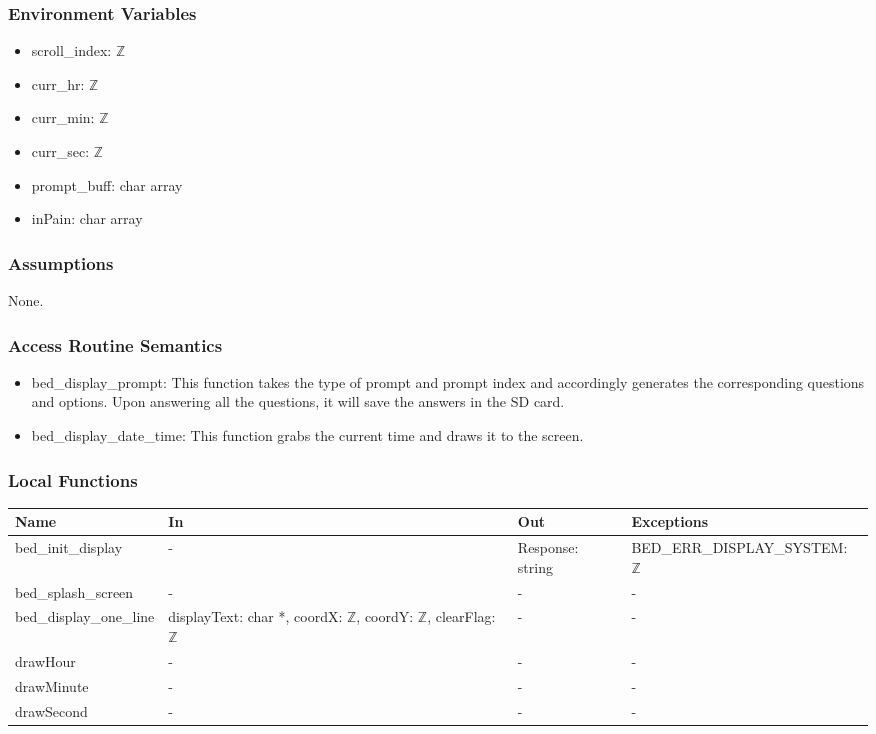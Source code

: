 \documentclass[12pt, titlepage]{article}
\begin{document}
\subsubsection{Environment Variables}

\begin{itemize}
\item scroll\_index: $\mathbb{Z}$
\item curr\_hr: $\mathbb{Z}$
\item curr\_min: $\mathbb{Z}$
\item curr\_sec: $\mathbb{Z}$
\item prompt\_buff: char array
\item inPain: char array
\end{itemize}

\subsubsection{Assumptions}

None.

\subsubsection{Access Routine Semantics}

\begin{itemize}
\item bed\_display\_prompt: This function takes the type of prompt and prompt index and accordingly generates the corresponding questions and options. Upon answering all the questions, it will save the answers in the SD card.
\item bed\_display\_date\_time: This function grabs the current time and draws it to the screen.
\end{itemize}

\subsubsection{Local Functions}

\begin{center}
\begin{tabular}{p{3cm} p{3cm} p{3.5cm} p{4cm}}
\hline
\textbf{Name} & \textbf{In} & \textbf{Out} & \textbf{Exceptions} \\
\hline
bed\_init\_display & - & Response: string & BED\_ERR\_DISPLAY\_SYSTEM: $\mathbb{Z}$  \\
bed\_splash\_screen & - & - & - \\
bed\_display\_one\_line & displayText: char *, coordX: $\mathbb{Z}$, coordY: $\mathbb{Z}$, clearFlag: $\mathbb{Z}$ & - & -   \\
drawHour & - & - & - \\
drawMinute & - & - & -  \\
drawSecond & - & - & - \\
\hline
\end{tabular}
\end{center}
\end{document}
